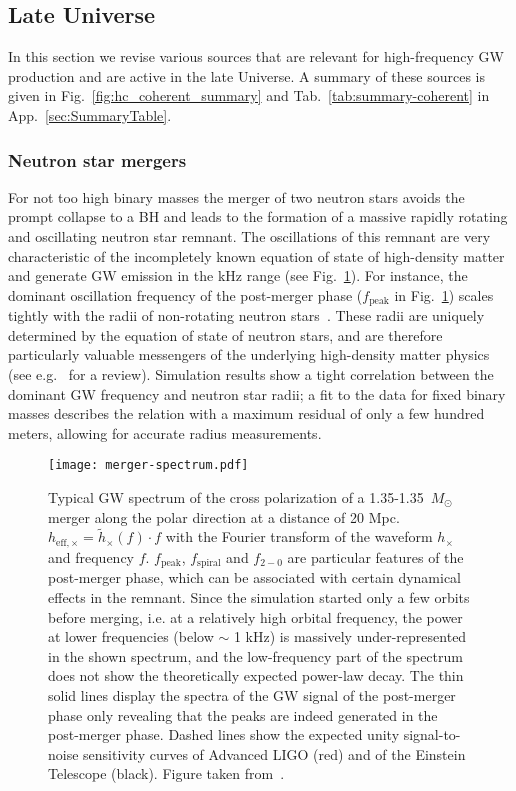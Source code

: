 \documentclass[11pt,a4paper]{article}
\begin{document}
\subsection{Late Universe \label{sec:lateU}}

In this section we revise various sources that are relevant for high-frequency GW production and are active in the late Universe. A summary of these sources is given in Fig.~\ref{fig:hc_coherent_summary} and Tab.~\ref{tab:summary-coherent} in App.~\ref{sec:SummaryTable}.

\subsubsection{Neutron star mergers \label{sec:NS}}
For not too high binary masses the merger of two neutron stars avoids the prompt collapse to a BH and leads to the formation of a massive rapidly rotating and oscillating neutron star remnant. The oscillations of this remnant are very characteristic of the incompletely known equation of state of high-density matter and generate GW emission in the kHz range (see Fig.~\ref{fig:spec}). For instance, the dominant oscillation frequency of the post-merger phase ($f_\mathrm{peak}$ in Fig.~\ref{fig:spec}) scales tightly with the radii of non-rotating neutron stars~\cite{Bauswein2016}. These radii are uniquely determined by the equation of state of neutron stars, and are therefore particularly valuable messengers of the underlying high-density matter physics (see e.g.~\cite{Oertel2017} for a review). Simulation results show a tight correlation between the dominant GW frequency and neutron star radii; a fit to the data for fixed binary masses describes the relation with a maximum residual of only a few hundred meters, allowing for accurate radius measurements.
\begin{figure}
\begin{center}
    \texttt{[image: merger-spectrum.pdf]}
  \end{center}
  \caption{Typical GW spectrum of the cross polarization of a 1.35-1.35~$M_\odot$ merger along the polar direction at a distance of 20 Mpc. $h_\mathrm{eff,\times} = \tilde{h}_\times(f)\cdot f$ with the Fourier transform of the waveform $h_\mathrm{\times}$ and frequency $f$. $f_\mathrm{peak}$, $f_\mathrm{spiral}$ and $f_{2-0}$ are particular features of the post-merger phase, which can be associated with certain dynamical effects in the remnant. Since the simulation started only a few orbits before merging, i.e. at a relatively high orbital frequency, the power at lower frequencies (below $\sim$ 1 kHz) is massively under-represented in the shown spectrum, and the low-frequency part of the spectrum does not show the theoretically expected power-law decay. The thin solid lines display the spectra of the GW signal of the post-merger phase only revealing that the peaks are indeed generated in the post-merger phase. Dashed lines show the expected unity signal-to-noise sensitivity curves of Advanced LIGO (red) and of the Einstein Telescope (black). Figure taken from~\cite{Bauswein2016}.}
  \label{fig:spec}
\end{figure}
\end{document}
